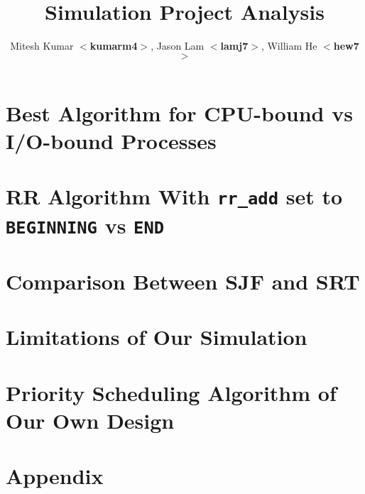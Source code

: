 \documentclass{article}
\title{\textbf{Simulation Project Analysis}}
\author{Mitesh Kumar $<$\textbf{kumarm4}$>$, Jason Lam $<$\textbf{lamj7}$>$, William He $<$\textbf{hew7}$>$}
\begin{document}
\maketitle

\section{Best Algorithm for CPU-bound vs I/O-bound Processes}
\section{RR Algorithm With {\tt rr\_add} set to {\tt BEGINNING} vs {\tt END}}
\section{Comparison Between SJF and SRT}
\section{Limitations of Our Simulation}
\section{Priority Scheduling Algorithm of Our Own Design}
\section{Appendix}
\end{document}
